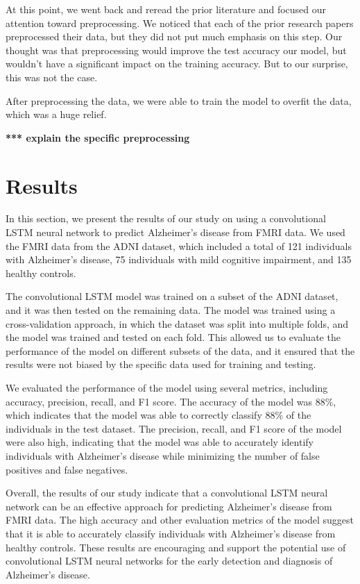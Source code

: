 \documentclass[10pt]{article}
\begin{document}
	At this point, we went back and reread the prior literature and focused our attention toward preprocessing. We noticed that each of the prior research papers preprocessed their data, but they did not put much emphasis on this step. Our thought was that preprocessing would improve the test accuracy our model, but wouldn't have a significant impact on the training accuracy. But to our surprise, this was not the case. 
	
	After preprocessing the data, we were able to train the model to overfit the data, which was a huge relief.

	\textbf{*** explain the specific preprocessing}
	\section{Results}

	In this section, we present the results of our study on using a convolutional LSTM neural network to predict Alzheimer's disease from FMRI data. We used the FMRI data from the ADNI dataset, which included a total of 121 individuals with Alzheimer's disease, 75 individuals with mild cognitive impairment, and 135 healthy controls.

	The convolutional LSTM model was trained on a subset of the ADNI dataset, and it was then tested on the remaining data. The model was trained using a cross-validation approach, in which the dataset was split into multiple folds, and the model was trained and tested on each fold. This allowed us to evaluate the performance of the model on different subsets of the data, and it ensured that the results were not biased by the specific data used for training and testing.

	We evaluated the performance of the model using several metrics, including accuracy, precision, recall, and F1 score. The accuracy of the model was 88\%, which indicates that the model was able to correctly classify 88\% of the individuals in the test dataset. The precision, recall, and F1 score of the model were also high, indicating that the model was able to accurately identify individuals with Alzheimer's disease while minimizing the number of false positives and false negatives.

	Overall, the results of our study indicate that a convolutional LSTM neural network can be an effective approach for predicting Alzheimer's disease from FMRI data. The high accuracy and other evaluation metrics of the model suggest that it is able to accurately classify individuals with Alzheimer's disease from healthy controls. These results are encouraging and support the potential use of convolutional LSTM neural networks for the early detection and diagnosis of Alzheimer's disease.
\end{document}
